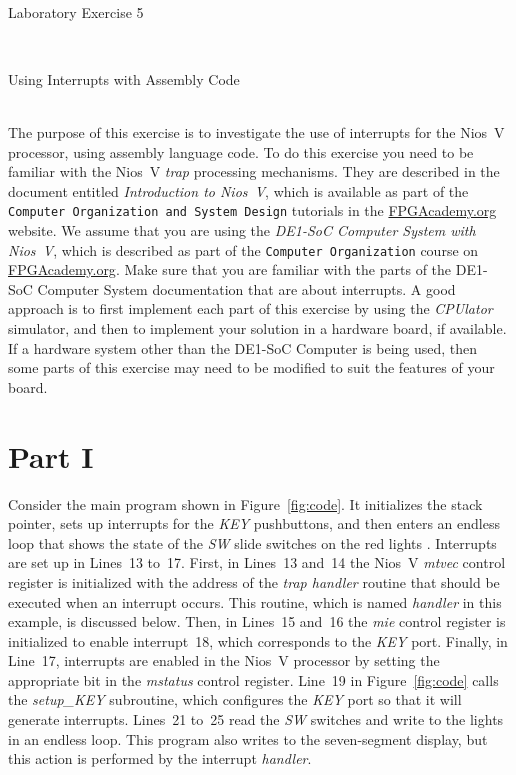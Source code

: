 \documentclass[epsfig,10pt,fullpage]{article}
\begin{document}
~\\
\centerline{\huge Laboratory Exercise 5}
~\\
\centerline{\large Using Interrupts with Assembly Code}
~\\

\noindent
The purpose of this exercise is to investigate the use of interrupts for the 
Nios\textsuperscript{\textregistered}~V processor, using assembly language code. To do 
this exercise you need to be familiar with the Nios~V {\it trap} processing mechanisms.
They are described in the document entitled {\it Introduction to Nios~V}, which is
available as part of the \texttt{Computer Organization and System Design} tutorials in the 
{\href{https://www.fpgacademy.org/tutorials.html} {FPGAcademy.org}} website.
We assume that you are using the {\it DE1-SoC Computer System with Nios~V},
which is described as part of the \texttt{Computer Organization} course on
{\href{https://www.fpgacademy.org/courses.html} {FPGAcademy.org}}. Make sure that you are
familiar with the parts of the DE1-SoC Computer System documentation that are about
interrupts.  A good approach is to first implement each part of this exercise by 
using the {\it CPUlator} simulator, and then to implement your solution in a hardware board,
if available.  If a hardware system other than the DE1-SoC Computer is being used, then 
some parts of this exercise may need to be modified to suit the features of your board. 

\section*{Part I}
Consider the main program shown in Figure~\ref{fig:code}.  It initializes the stack
pointer, sets up interrupts for the {\it KEY} pushbuttons, and then enters an endless loop that
shows the state of the {\it SW} slide switches on the red lights . Interrupts
are set up in Lines~13 to~17. First, in Lines~13 and~14 the Nios~V {\it mtvec} control register
is initialized with the address of the {\it trap handler} routine that should be executed when
an interrupt occurs. This routine, which is named {\it handler} in this example, is 
discussed below. Then, in Lines~15 and~16 the {\it mie} control register is initialized to enable
interrupt~18, which corresponds to the {\it KEY} port. Finally, in Line~17, interrupts are 
enabled in the Nios~V processor by setting the appropriate bit in the {\it mstatus} control
register. Line~19 in Figure~\ref{fig:code}
calls the {\it setup\_KEY} subroutine, which configures the {\it KEY} port 
so that it will generate interrupts. Lines~21 to~25 read the {\it SW} switches and write to the
 lights in an endless loop. This program also writes to the 
seven-segment display, but this action is performed by the interrupt {\it handler}.
\end{document}
